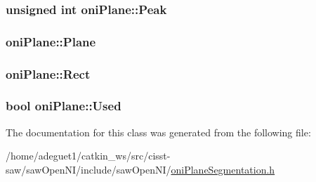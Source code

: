 \hypertarget{classoni_plane_a5b0c0a28d09f27c879464b4ddf67578e}{
\subsubsection[{Peak}]{\setlength{\rightskip}{0pt plus 5cm}unsigned int oni\-Plane\-::\-Peak}}\label{classoni_plane_a5b0c0a28d09f27c879464b4ddf67578e}
\hypertarget{classoni_plane_acde480a1ed54a84b6516b80f55149c08}{
\subsubsection[{Plane}]{ oni\-Plane\-::\-Plane}}\label{classoni_plane_acde480a1ed54a84b6516b80f55149c08}
\hypertarget{classoni_plane_afd6f4fda85393983081d8fc25d3af0d5}{
\subsubsection[{Rect}]{ oni\-Plane\-::\-Rect}}\label{classoni_plane_afd6f4fda85393983081d8fc25d3af0d5}
\hypertarget{classoni_plane_a341b7fd56afc83f1c52a23339d2360af}{
\subsubsection[{Used}]{\setlength{\rightskip}{0pt plus 5cm}bool oni\-Plane\-::\-Used}}\label{classoni_plane_a341b7fd56afc83f1c52a23339d2360af}


The documentation for this class was generated from the following file\-:\begin{DoxyCompactItemize}
\item 
/home/adeguet1/catkin\-\_\-ws/src/cisst-\/saw/saw\-Open\-N\-I/include/saw\-Open\-N\-I/\hyperlink{oni_plane_segmentation_8h}{oni\-Plane\-Segmentation.\-h}\end{DoxyCompactItemize}
